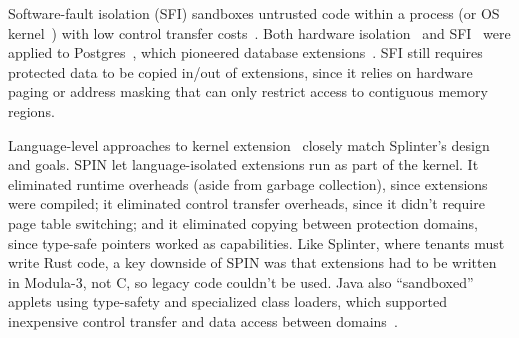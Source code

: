Software-fault isolation (SFI) sandboxes untrusted code within a
process (or OS kernel~\cite{lcds,vino,nooks}) with low control transfer costs~\cite{wedge,vx32,pnacl,sfi-cisc,nacl}.
Both hardware isolation~\cite{write-protect-db} and SFI~\cite{efficient-sfi}
were applied to Postgres~\cite{postgres}, which pioneered
database extensions~\cite{postgres-extensions}.  SFI still requires protected
data to be copied in/out of extensions, since it relies on hardware
paging or address masking that can only restrict access to contiguous memory
regions.



Language-level approaches to kernel extension~\cite{spin,singularity} closely
match Splinter's design and goals. SPIN let language-isolated extensions run
as part of the kernel. It eliminated runtime overheads (aside from garbage
collection), since extensions were compiled; it eliminated control transfer
overheads, since it didn't require page table switching; and it eliminated
copying between protection domains, since type-safe pointers worked as
capabilities.
Like Splinter, where tenants must write Rust code, a
key downside of SPIN was that extensions had
to be written in Modula-3, not C, so legacy code couldn't be used.
%
Java also ``sandboxed'' applets using type-safety and specialized class
loaders, which supported inexpensive control transfer and data access between
domains~\cite{extensible-java}.

